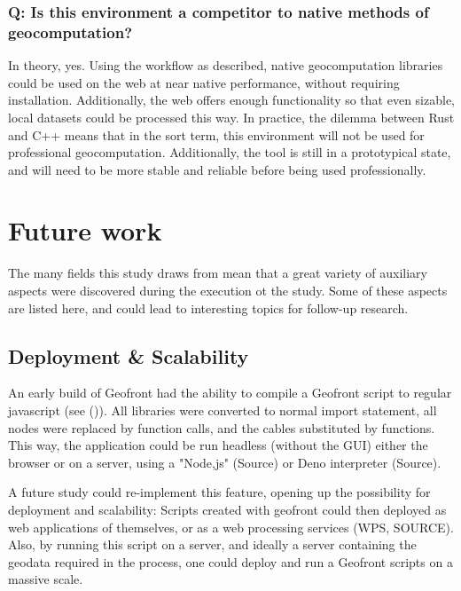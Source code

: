 \subsubsection*{Q: Is this environment a competitor to native methods of geocomputation?}

In theory, yes.
Using the workflow as described, native geocomputation libraries could be used on the web at near native performance, without requiring installation.
Additionally, the web offers enough functionality so that even sizable, local datasets could be processed this way.
In practice, the dilemma between Rust and C++ means that in the sort term, this environment will not be used for professional geocomputation.
Additionally, the tool is still in a prototypical state, and will need to be more stable and reliable before being used professionally. 


\section{Future work}
\label{sec:future-work}
The many fields this study draws from mean that a great variety of auxiliary aspects were discovered during the execution ot the study. 
Some of these aspects are listed here, and could lead to interesting topics for follow-up research. 

\subsection{Deployment \& Scalability}
An early build of Geofront had the ability to compile a Geofront script to regular javascript (see ()).  
All libraries were converted to normal import statement, all nodes were replaced by function calls, and the cables substituted by functions. 
This way, the application could be run headless (without the \ac{GUI}) either the browser or on a server, using a "Node,js" (Source) or Deno interpreter (Source).

A future study could re-implement this feature, opening up the possibility for deployment and scalability: 
Scripts created with geofront could then deployed as web applications of themselves, or as a web processing services (WPS, SOURCE).
Also, by running this script on a server, and ideally a server containing the geodata required in the process, one could deploy and run a Geofront scripts on a massive scale. 

